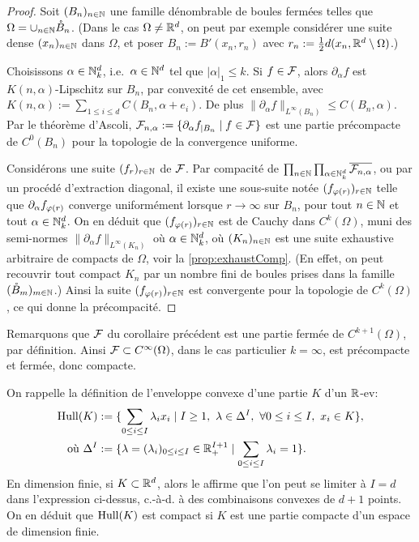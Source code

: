 \begin{proof}
	Soit $(B_n)_{n \in \mathbb{N}}$ une famille dénombrable de boules fermées telles que $\Omega = \cup_{n \in \mathbb{N}} \mathring B_n$. (Dans le cas $\Omega\neq \mathbb{R}^d$, on peut par exemple considérer une suite dense $(x_n)_{n \in \mathbb{N}}$ dans $\Omega$, et poser $B_n := B'(x_n,r_n)$ avec $r_n := \frac 1 2 d(x_n, \mathbb{R}^d \setminus \Omega)$.)
	
	Choisissons $\alpha \in \mathbb{N}^d_k$, i.e.\ $\alpha \in \mathbb{N}^d$ tel que $|\alpha|_1 \leq k$. Si $f \in \mathcal{F}$, alors $\partial_\alpha f$ est $K(n,\alpha)$-Lipschitz sur $B_n$, par convexité de cet ensemble, avec $K(n,\alpha) := \sum_{1 \leq i \leq d} C(B_n, \alpha+e_i)$. De plus $\|\partial_\alpha f\|_{L^\infty(B_n)} \leq C(B_n,\alpha)$.
	Par le théorème d'Ascoli, $\mathcal{F}_{n,\alpha} := \{\partial_\alpha f_{|B_n} \mid f \in \mathcal{F}\}$ est une partie précompacte de $C^0(B_n)$ pour la topologie de la convergence uniforme. 
	
	Considérons une suite $(f_r)_{r \in \mathbb{N}}$ de $\mathcal{F}$.
	Par compacité de $\prod_{n \in \mathbb{N}} \prod_{\alpha\in \mathbb{N}^d_k} \overline {\mathcal{F}_{n,\alpha}}$, ou par un procédé d'extraction diagonal, il existe une sous-suite notée $(f_{\varphi(r)})_{r \in \mathbb{N}}$ telle que $\partial_\alpha f_{\varphi(r)}$ converge uniformément lorsque $r \to \infty$ sur $B_n$, pour tout $n \in \mathbb{N}$ et tout $\alpha \in \mathbb{N}^d_k$.
	On en déduit que $(f_{\varphi(r)})_{r \in \mathbb{N}}$ est de Cauchy dans $C^k(\Omega)$, muni des semi-normes $\|\partial_\alpha f\|_{L^\infty(K_n)}$ où $\alpha \in \mathbb{N}^d_k$, où $(K_n)_{n \in \mathbb{N}}$ est une suite exhaustive arbitraire de compacts de $\Omega$, voir la \cref{prop:exhaustComp}. 
	(En effet, on peut recouvrir tout compact $K_n$ par un nombre fini de boules prises dans la famille $(\mathring B_m)_{m \in \mathbb{N}}$.) 
	Ainsi la suite $(f_{\varphi(r)})_{r \in \mathbb{N}}$ est convergente pour la topologie de $C^k(\Omega)$, ce qui donne la précompacité.
\end{proof}

Remarquons que $\mathcal{F}$ du corollaire précédent est une partie fermée de $C^{k+1}(\Omega)$, par définition. Ainsi $\mathcal{F} \subset C^\infty(\Omega)$, dans le cas particulier $k=\infty$, est précompacte et fermée, donc compacte.  



On rappelle la définition de l'enveloppe convexe d'une partie $K$ d'un $\mathbb{R}$-ev:
\begin{align*}
	\operatorname{Hull}(K) &:= \{ \sum_{0 \leq i \leq I} \lambda_i x_i \mid 
	I \geq 1,\ \lambda \in \Delta^I,\ \forall 0 \leq i \leq I,\ x_i \in K\}, \\
	\text{où }\Delta^I &:= \{\lambda = (\lambda_i)_{0 \leq i \leq I} \in \mathbb{R}_+^{I+1} \mid \sum_{0 \leq i \leq I} \lambda_i = 1\}.
\end{align*}
En dimension finie, si $K\subset \mathbb{R}^d$, alors le  affirme que l'on peut se limiter à $I=d$ dans l'expression ci-dessus, c.-à-d. à des combinaisons convexes de $d+1$ points. On en déduit que $\operatorname{Hull}(K)$ est compact si $K$ est une partie compacte d'un espace de dimension finie.

